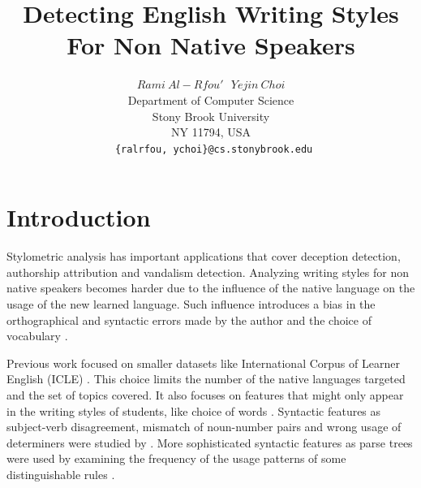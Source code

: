\documentclass[10pt,a5paper,twoside]{article}
\title{Detecting English Writing Styles For Non Native Speakers}
\author{$Rami~Al-Rfou'~~~Yejin~Choi$ \\
  Department of Computer Science \\
  Stony Brook University \\
  NY 11794, USA \\
  \texttt{ \{ralrfou, ychoi\}@cs.stonybrook.edu}}
\begin{document}
\maketitle
{}


\newpage

\section{Introduction}
Stylometric analysis has important applications that cover deception detection, authorship attribution and vandalism detection.
Analyzing writing styles for non native speakers becomes harder due to the influence of the native language on the usage of the new learned language.
Such influence introduces a bias in the orthographical and syntactic errors made by the author and the choice of vocabulary \cite{koppel2005automatically}.

Previous work focused on smaller datasets like {International Corpus of Learner English} (ICLE) \cite{koppel2005automatically, koppel2005determining, argamon2009automatically}. This choice limits the number of the native languages targeted and the set of topics covered.
It also focuses on features that might only appear in the writing styles of
students, like choice of words \cite{tsur2007using, zheng2003authorship,
gamon2004linguistic}. Syntactic features as subject-verb disagreement, mismatch of noun-number pairs and wrong usage of determiners were studied by \cite{wong2009contrastive}. More sophisticated syntactic features as parse trees were used by examining the frequency of the usage patterns of some distinguishable rules \cite{wong2010parser, wongdras2011EMNLP}.
\end{document}
